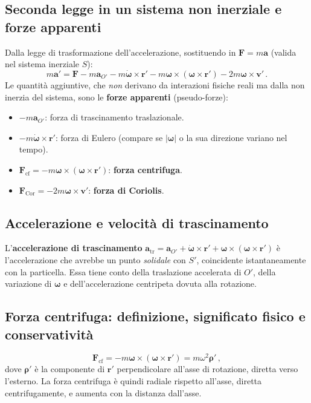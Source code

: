 \documentclass[11pt,a4paper]{article}
\renewcommand{\vec}[1]{\bm{#1}}
\newcommand{\om}{\vec{\omega}}
\theoremstyle{plain}
\theoremstyle{definition}
\theoremstyle{remark}
\begin{document}
\subsection{Seconda legge in un sistema non inerziale e forze apparenti}

Dalla legge di trasformazione dell'accelerazione, sostituendo in $\vec{F}=m\vec{a}$
(valida nel sistema inerziale $S$):
\[
  m\vec{a}'=\vec{F}
            -m\vec{a}_{O'}
            -m\dot{\om}\times\vec{r}'
            -m\om\times(\om\times\vec{r}')
            -2m\om\times\vec{v}'\,.
\]
Le quantità aggiuntive, che \emph{non} derivano da interazioni fisiche reali
ma dalla non inerzia del sistema, sono le \textbf{forze apparenti} (pseudo-forze):
\begin{itemize}
  \item $-m\vec{a}_{O'}$: forza di trascinamento traslazionale.
  \item $-m\dot{\om}\times\vec{r}'$: forza di Eulero (compare se $|\om|$ o la
    sua direzione variano nel tempo).
  \item $\vec{F}_\mathrm{cf}=-m\om\times(\om\times\vec{r}')$: \textbf{forza centrifuga}.
  \item $\vec{F}_\mathrm{Cor}=-2m\om\times\vec{v}'$: \textbf{forza di Coriolis}.
\end{itemize}

\subsection{Accelerazione e velocità di trascinamento}

L'\textbf{accelerazione di trascinamento}
$\vec{a}_\mathrm{tr}=\vec{a}_{O'}+\dot{\om}\times\vec{r}'+\om\times(\om\times\vec{r}')$
è l'accelerazione che avrebbe un punto \emph{solidale} con $S'$, coincidente
istantaneamente con la particella. Essa tiene conto della traslazione
accelerata di $O'$, della variazione di $\om$ e dell'accelerazione centripeta
dovuta alla rotazione.

\subsection{Forza centrifuga: definizione, significato fisico e conservatività}

\[
  \vec{F}_\mathrm{cf}=-m\om\times(\om\times\vec{r}')=m\omega^2\vec{\rho}'\,,
\]
dove $\vec{\rho}'$ è la componente di $\vec{r}'$ perpendicolare all'asse di
rotazione, diretta verso l'esterno. La forza centrifuga è quindi radiale
rispetto all'asse, diretta centrifugamente, e aumenta con la distanza dall'asse.
\end{document}
